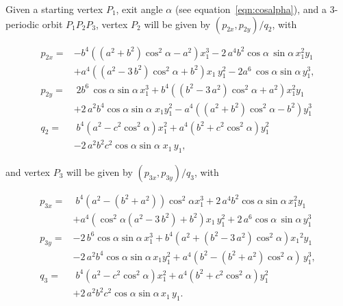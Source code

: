\documentclass{amsart}
\theoremstyle{definition}
\begin{document}
Given a starting vertex $P_1$,  exit angle $\alpha$ (see equation~\eqref{eqn:cosalpha}), and a 3-periodic orbit $P_1P_2P_3$, vertex $P_2$ will be given by $(p_{2x},p_{2y})/q_2$, with \cite{garcia2019-ellipses}

\begin{align*}
p_{2x}=&-{b}^{4} \left(  \left(   a^2+{b}^{2}\right)\cos^{2}\alpha   -{a}^{2}  \right) x_1^{3}-2\,{a}^{4}{b}^{2} \cos \alpha  \,\sin  \alpha  \,  x_1^{2}{y_1}\\
&+{a}^{4} \left(  ({a
}^{2}-3\, {b}^{2}) \cos^{2} \alpha  +{b}^{2}
 \right) {x_1}\,y_1^{2}-2{a}^{6} \,\cos  \alpha  \sin   \alpha  \, y_1^{3} ,
\\
p_{2y}=&\; 2{b}^{6} \,\cos \alpha\sin \alpha\,   x_1^{3}+{b}^{4}\left(  ({b
 }^{2}-3\, {a}^{2}) \cos^{2} \alpha  +{a}^{2}
  \right) x_1^{2}{y_1}\\
&+  2\,{a}^{2} {b}^{4}\cos \alpha \sin
  \alpha \; {x_1} y_1^{2} -{
a}^{4}  \left(  \left(   a^2+{b}^{2}\right)\cos^{2}  \alpha  -{b}^{2}  \right)  y_1^{3}
\\
q_2=& \; {b}^{4} \left( a^2-c^2\cos^2\alpha   \right)
x_1^{2}+{a}^{4} \left(  {b}^{2}+c^2\cos^2 \alpha  
 \right) y_1^{2}\\
 & - 2\, {a}^{2}{b}^{2}{c^2}\cos \alpha\sin \alpha \; {x_1}\,{
y_1},
\end{align*}

and vertex $P_3$ will be given by $(p_{3x},p_{3y})/q_3$, with

\begin{align*}
p_{3x}=& \; {b}^{4} \left( {a}^{2}- \left( {b}^{2}+{a}^{2} \right) \right)
 \cos^{2}  \alpha   x_1^{3} +2\,{a}^{4}{b}^{2} \cos  \alpha \sin \alpha\,   x_1^{2}{ y_1}\\
 &+{a}^{4} \left( 
  \cos^{2}  \alpha  \left( {a}^{2}-3\,{b}^{2}
 \right) +{b}^{2} \right) { x_1}\, y_1^{2} +2\, {a}^{6} 
 \cos \alpha\,\sin \alpha\, y_1^{3}
\\
p_{3y}=&  -2\, {b}^{6} \cos \alpha\sin \alpha\, x_1^{3}+{b}^{4} \left( {a}^{2}+ \left( {b}^{2}-3\,{a}^{2} \right)    \cos^2\alpha \right) {{ x_1}}^{2}{ y_1}
\\
& -2\,{a}^{2}  {b}^{4}\cos
 \alpha  \sin \alpha\,  x_1 y_1^{2}+
 {a}^{4} \left( {b}^{2}- \left( {b}^{2}+{a}^{2} \right)   \cos^{2}  \alpha  \right)\,  y_1^{3},
\\
q_3=& \;{b}^{4} \left( {a}^{2}-{c^2}\cos^{2}\alpha   \right) x_1^{2}+{a}^{4} \left( {b}^{2}+c^2\cos^{2}\alpha  \right)  y_1^{2}\\
&+2\,{a}^{2}{b}^{
2} c^2 \cos\alpha \sin\alpha\, { x_1}\,{ y_1}.
\end{align*}
\end{document}
